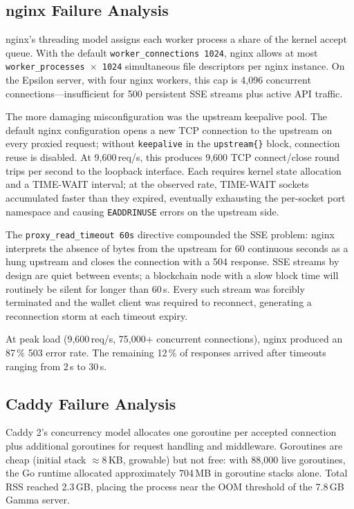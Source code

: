 \documentclass[a4paper, 11pt]{article}
\begin{document}
\subsection{nginx Failure Analysis}

nginx's threading model assigns each worker process a share of the kernel
accept queue.  With the default \texttt{worker\_connections~1024}, nginx allows
at most \texttt{worker\_processes~$\times$~1024} simultaneous file descriptors per
nginx instance.  On the Epsilon server, with four nginx workers, this cap is
4{,}096 concurrent connections---insufficient for 500 persistent SSE streams plus
active API traffic.

The more damaging misconfiguration was the upstream keepalive pool.  The default
nginx configuration opens a new TCP connection to the upstream on every proxied
request; without \texttt{keepalive} in the \texttt{upstream\{\}} block, connection
reuse is disabled.  At 9{,}600\,req/s, this produces 9{,}600 TCP connect/close
round trips per second to the loopback interface.  Each requires kernel state
allocation and a TIME-WAIT interval; at the observed rate, TIME-WAIT sockets
accumulated faster than they expired, eventually exhausting the per-socket port
namespace and causing \texttt{EADDRINUSE} errors on the upstream side.

The \texttt{proxy\_read\_timeout~60s} directive compounded the SSE problem:
nginx interprets the absence of bytes from the upstream for 60 continuous seconds
as a hung upstream and closes the connection with a 504 response.  SSE streams by
design are quiet between events; a blockchain node with a slow block time will
routinely be silent for longer than 60\,s.  Every such stream was forcibly
terminated and the wallet client was required to reconnect, generating a
reconnection storm at each timeout expiry.

At peak load (9{,}600\,req/s, 75{,}000+ concurrent connections), nginx produced
an 87\,\% 503 error rate.  The remaining 12\,\% of responses arrived after
timeouts ranging from 2\,s to 30\,s.

\subsection{Caddy Failure Analysis}

Caddy 2's concurrency model allocates one goroutine per accepted connection plus
additional goroutines for request handling and middleware.  Goroutines are cheap
(initial stack $\approx 8$\,KB, growable) but not free: with 88{,}000 live
goroutines, the Go runtime allocated approximately 704\,MB in goroutine stacks
alone.  Total RSS reached 2.3\,GB, placing the process near the OOM threshold of
the 7.8\,GB Gamma server.
\end{document}
